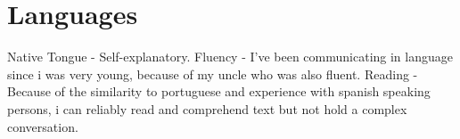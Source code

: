 \section{Languages}
{Native Tongue - Self-explanatory.}
{Fluency - I've been communicating in language since i was very young, because of my uncle who was also fluent.}
{Reading - Because of the similarity to portuguese and experience with spanish speaking persons, i can reliably read and comprehend text but not hold a complex conversation.}
